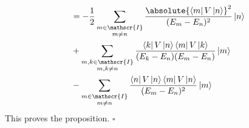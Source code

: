 \documentclass[10pt,fleqn]{article}
\newcommand{\bra}[1]{\left\langle #1 \right\vert}
\newcommand{\ket}[1]{\left\vert #1 \right\rangle}
\begin{document}
\begin{multicols}{2}
\begin{align*}
        &= -\frac{1}{2} \sum_{\substack{m\in\mathscr{I}\\m\neq n}} \frac{\absolute{\bra{m}V\ket{n}}^2}{(E_m-E_n)^2} \ket{n} \\
        &+ \sum_{\substack{m,k\in\mathscr{I}\\m,k\neq n}} \frac{\bra{k}V\ket{n} \bra{m}V\ket{k}}{(E_k-E_n)(E_m-E_n)} \ket{m} \\
        &- \sum_{\substack{m\in\mathscr{I}\\m\neq n}} \frac{\bra{n}V\ket{n} \bra{m}V\ket{n}}{(E_m-E_n)^2} \ket{m}
      \end{align*}
      This proves the proposition.
      \hfill$\square{}$
  \end{multicols}
\end{document}
